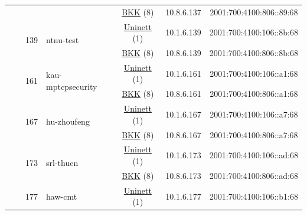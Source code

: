 \begin{small}
\begin{center}
\begin{longtable}{|c|c|c|c|c|c|c|c|}
  &  &  &  & \multicolumn{2}{|c|}{\tiny{\href{http://bkk.no}{BKK} (8)}} & \tiny{10.8.6.137} & \tiny{2001:700:4100:806::89:68} \\* \cline{3-3}\cline{4-4}\cline{5-5}\cline{6-6}\cline{7-7}\cline{8-8}
  &  & \multirow{2}{*}{\tiny{139}} & \multicolumn{1}{|l|}{\multirow{2}{*}{\tiny{ntnu-test}}} & \multicolumn{2}{|c|}{\tiny{\href{https://www.uninett.no}{Uninett} (1)}} & \tiny{10.1.6.139} & \tiny{2001:700:4100:106::8b:68} \\* \cline{5-5}\cline{6-6}\cline{7-7}\cline{8-8}
  &  &  &  & \multicolumn{2}{|c|}{\tiny{\href{http://bkk.no}{BKK} (8)}} & \tiny{10.8.6.139} & \tiny{2001:700:4100:806::8b:68} \\* \cline{3-3}\cline{4-4}\cline{5-5}\cline{6-6}\cline{7-7}\cline{8-8}
  &  & \multirow{2}{*}{\tiny{161}} & \multicolumn{1}{|l|}{\multirow{2}{*}{\tiny{kau-mptcpsecurity}}} & \multicolumn{2}{|c|}{\tiny{\href{https://www.uninett.no}{Uninett} (1)}} & \tiny{10.1.6.161} & \tiny{2001:700:4100:106::a1:68} \\* \cline{5-5}\cline{6-6}\cline{7-7}\cline{8-8}
  &  &  &  & \multicolumn{2}{|c|}{\tiny{\href{http://bkk.no}{BKK} (8)}} & \tiny{10.8.6.161} & \tiny{2001:700:4100:806::a1:68} \\* \cline{3-3}\cline{4-4}\cline{5-5}\cline{6-6}\cline{7-7}\cline{8-8}
  &  & \multirow{2}{*}{\tiny{167}} & \multicolumn{1}{|l|}{\multirow{2}{*}{\tiny{hu-zhoufeng}}} & \multicolumn{2}{|c|}{\tiny{\href{https://www.uninett.no}{Uninett} (1)}} & \tiny{10.1.6.167} & \tiny{2001:700:4100:106::a7:68} \\* \cline{5-5}\cline{6-6}\cline{7-7}\cline{8-8}
  &  &  &  & \multicolumn{2}{|c|}{\tiny{\href{http://bkk.no}{BKK} (8)}} & \tiny{10.8.6.167} & \tiny{2001:700:4100:806::a7:68} \\* \cline{3-3}\cline{4-4}\cline{5-5}\cline{6-6}\cline{7-7}\cline{8-8}
  &  & \multirow{2}{*}{\tiny{173}} & \multicolumn{1}{|l|}{\multirow{2}{*}{\tiny{srl-thuen}}} & \multicolumn{2}{|c|}{\tiny{\href{https://www.uninett.no}{Uninett} (1)}} & \tiny{10.1.6.173} & \tiny{2001:700:4100:106::ad:68} \\* \cline{5-5}\cline{6-6}\cline{7-7}\cline{8-8}
  &  &  &  & \multicolumn{2}{|c|}{\tiny{\href{http://bkk.no}{BKK} (8)}} & \tiny{10.8.6.173} & \tiny{2001:700:4100:806::ad:68} \\* \cline{3-3}\cline{4-4}\cline{5-5}\cline{6-6}\cline{7-7}\cline{8-8}
  &  & \multirow{2}{*}{\tiny{177}} & \multicolumn{1}{|l|}{\multirow{2}{*}{\tiny{haw-cmt}}} & \multicolumn{2}{|c|}{\tiny{\href{https://www.uninett.no}{Uninett} (1)}} & \tiny{10.1.6.177} & \tiny{2001:700:4100:106::b1:68} \\* \cline{5-5}\cline{6-6}\cline{7-7}\cline{8-8}

\end{longtable}
\end{center}
\end{small}
